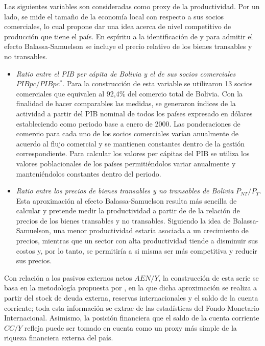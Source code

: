 \documentclass[12pt,letterpaper]{article}
\begin{document}
Las siguientes variables son consideradas como proxy de la productividad. Por un lado, se mide el tamaño de la economía local con respecto a sus socios comerciales, lo cual propone dar una idea acerca de nivel competitivo de producción que tiene el país. En espíritu a la identificación de \cite{clark1999exchange} y para admitir el efecto Balassa-Samuelson se incluye el precio relativo de los bienes transables y no transables.
\begin{itemize}
\item \emph{Ratio entre el PIB per cápita de Bolivia y el de sus socios comerciales} $PIBpc/PIBpc^*$. Para la construcción de esta variable se utilizaron 13 socios comerciales que equivalen al 92,4\% del comercio total de Bolivia. Con la finalidad de hacer comparables las medidas, se generaron índices de la actividad a partir del PIB nominal de todos los países expresado en dólares estableciendo como periodo base a enero de 2000. Las ponderaciones de comercio para cada uno de los socios comerciales varían anualmente de acuerdo al flujo comercial y se mantienen constantes dentro de la gestión correspondiente. Para calcular los valores per cápitas del PIB se utiliza los valores poblacionales de los países permitiéndolos variar anualmente y manteniéndolos constantes dentro del periodo. 
\item \emph{Ratio entre los precios de bienes transables y no transables de Bolivia} $P_{NT}/P_T$. Esta aproximación al efecto Balassa-Samuelson resulta más sencilla de calcular y pretende medir la productividad a partir de de la relación de precios de los bienes transables y no transables. Siguiendo la idea de Balassa-Samuelson, una menor productividad estaría asociada a un crecimiento de precios, mientras que un sector con alta productividad tiende a disminuir sus costos y, por lo tanto, se permitiría a si misma ser más competitiva y reducir sus precios. 
\end{itemize}

Con relación a los pasivos externos netos $AEN/Y$, la construcción de esta serie se basa en la metodología propuesta por \cite{lane2001wealth}, en la que dicha aproximación se realiza a partir del stock de deuda externa, reservas internacionales y el saldo de la cuenta corriente; toda esta información se extrae de las estadísticas del Fondo Monetario Internacional. Asimismo, la posición financiera que el saldo de la cuenta corriente $CC/Y$ refleja puede ser tomado en cuenta como un proxy más simple de la riqueza financiera externa del país. 
\end{document}
